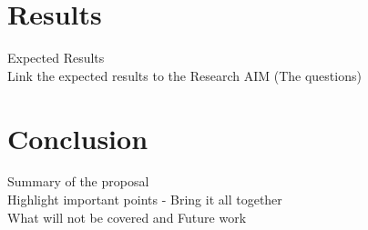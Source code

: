 \documentclass [titlepage,11pt]{article}
\begin{document}
\section{Results}
Expected Results \\
Link the expected results to the Research AIM (The questions)

\section{Conclusion}
Summary of the proposal \\
Highlight important points  - Bring it all together\\
What will not be covered and Future work \\


\end{document}

